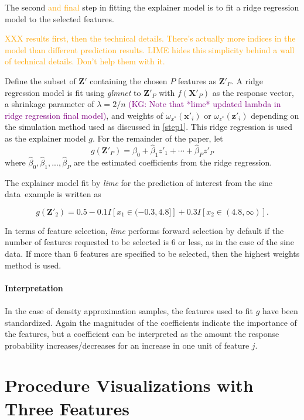 \documentclass[AMS,STIX2COL]{WileyNJD-v2}\usepackage[]{graphicx}\usepackage[]{color}
\newcommand{\hh}[1]{\textcolor{orange}{#1}}
\newcommand{\kgc}[1]{\textcolor{purple}{#1}}
\newcommand{\data}{sine data}
\begin{document}
{The second \hh{and final} step in fitting the explainer model is to fit a ridge regression model to the selected features.

\hh{XXX results first, then the technical details. There's actually more indices in the model than different prediction results. LIME hides this simplicity behind a wall of technical details. Don't help them with it.}

Define the subset of $\textbf{Z}'$ containing the chosen $P$ features as $\textbf{Z}'_P$. A ridge regression model is fit using \emph{glmnet} to $\textbf{Z}'_P$ with $f\left(\textbf{X}'_P\right)$ as the response vector, a shrinkage parameter of $\lambda=2/n$ \kgc{(KG: Note that *lime* updated lambda in ridge regression final model)}, and weights of $\omega_{x^*}(\textbf{x}'_i)$ or $\omega_{z^*}(\textbf{z}'_i)$ depending on the simulation method used as discussed in \autoref{step1}. This ridge regression is used as the explainer model $g$. For the remainder of the paper, let
  $$g\left(\textbf{Z}'_{P}\right)=\hat{\beta}_0+\hat{\beta}_1z'_{1}+\cdots+\hat{\beta}_Pz'_{P}$$
where $\hat{\beta}_0, \hat{\beta}_1,...,\hat{\beta}_P$ are the estimated coefficients from the ridge regression.

The explainer model fit by \emph{lime} for the prediction of interest from the \data \ example is written as

$$g\left(\textbf{Z}'_{2}\right) = 0.5-0.1I\left[x_1\in (-0.3, 4.8] \right]+0.3I\left[x_2\in (4.8, \ensuremath{\infty{}})\right].$$

In terms of feature selection, \emph{lime} performs forward selection by default if the number of features requested to be selected is 6 or less, as in the case of the \data. If more than 6 features are specified to be selected, then the highest weights method is used. \\
\\
\textbf{Interpretation}\\
\\
 In the case of density approximation samples, the features used to fit $g$ have been standardized. Again the magnitudes of the coefficients indicate the importance of the features, but a coefficient can be interpreted as the amount the response probability increases/decreases for an increase in one unit of feature $j$.

\section{Procedure Visualizations with Three Features} \label{scatter-plots}

}
\end{document}
